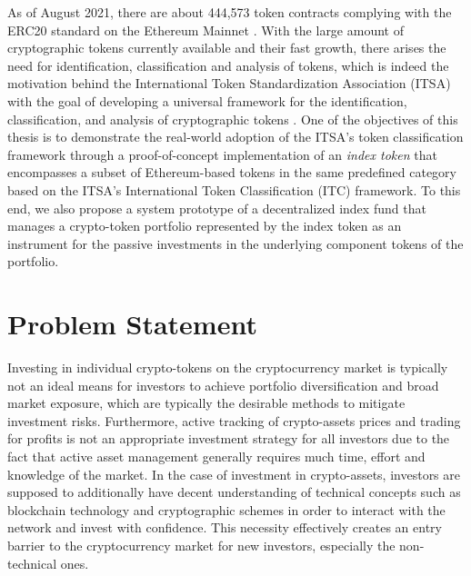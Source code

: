 As of August 2021, there are about 444,573 token contracts complying with the ERC20 standard on the Ethereum Mainnet \cite{etherscantokentracker}. With the large amount of cryptographic tokens currently available and their fast growth, there arises the need for identification, classification and analysis of tokens, which is indeed the motivation behind the International Token Standardization Association (ITSA) with the goal of developing a universal framework for the identification, classification, and analysis of cryptographic tokens \cite{itsadefinition}. One of the objectives of this thesis is to demonstrate the real-world adoption of the ITSA's token classification framework through a proof-of-concept implementation of an \textit{index token} that encompasses a subset of Ethereum-based tokens in the same predefined category based on the ITSA's International Token Classification (ITC) framework. To this end, we also propose a system prototype of a decentralized index fund that manages a crypto-token portfolio represented by the index token as an instrument for the passive investments in the underlying component tokens of the portfolio.

\section{Problem Statement}

    Investing in individual crypto-tokens on the cryptocurrency market is typically not an ideal means for investors to achieve portfolio diversification and broad market exposure, which are typically the desirable methods to mitigate investment risks. Furthermore, active tracking of crypto-assets prices and trading for profits is not an appropriate investment strategy for all investors due to the fact that active asset management generally requires much time, effort and knowledge of the market. In the case of investment in crypto-assets, investors are supposed to additionally have decent understanding of technical concepts such as blockchain technology and cryptographic schemes in order to interact with the network and invest with confidence. This necessity effectively creates an entry barrier to the cryptocurrency market for new investors, especially the non-technical ones. 

